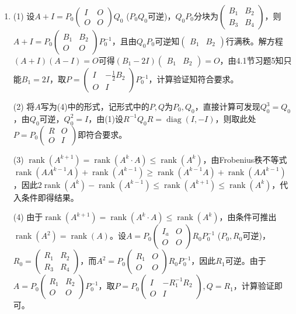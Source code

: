 \documentclass[a4paper,UTF8,fontset=windows]{ctexart}
\DeclareMathOperator{\diag}{diag}
\DeclareMathOperator{\rank}{rank}
\begin{document}
\begin{enumerate}
\item
(1) 设$A+I=P_0\begin{pmatrix}I&O\\O&O\end{pmatrix}Q_0$ ($P_0Q_0$可逆)，$Q_0P_0$分块为$\begin{pmatrix}B_1&B_2\\B_3&B_4\end{pmatrix}$，则$A+I=P_0\begin{pmatrix}B_1&B_2\\O&O\end{pmatrix}P_0^{-1}$，且由$Q_0P_0$可逆知$\begin{pmatrix}B_1&B_2\end{pmatrix}$行满秩。解方程$(A+I)(A-I)=O$可得$(B_1-2I)\begin{pmatrix}B_1&B_2\end{pmatrix}=O$，由4.1节习题5知只能$B_1=2I$，取$P=\begin{pmatrix}I&-\frac{1}{2}B_2\\O&I\end{pmatrix}P_0^{-1}$，计算验证知符合要求。

(2) 将$A$写为(4)中的形式，记形式中的$P,Q$为$P_0,Q_0$，直接计算可发现$Q_0^3=Q_0$，由$Q_0$可逆，$Q_0^2=I$，由(1)设$R^{-1}Q_0R=\diag(I,-I)$，则取此处$P=P_0\begin{pmatrix}R&O\\O&I\end{pmatrix}$即符合要求。

(3) $\rank(A^{k+1})=\rank(A^k\cdot A)\le\rank(A^k)$，由Frobenius秩不等式$\rank(AA^{k-1}A)+\rank(A^{k-1})\ge \rank(A^{k-1}A)+\rank(AA^{k-1})$，因此$2\rank(A^k)-\rank(A^{k-1})\le \rank(A^{k+1})\le\rank(A^k)$，代入条件即得结果。

(4) 由于$\rank(A^{k+1})=\rank(A^k\cdot A)\le\rank(A^k)$，由条件可推出$\rank(A^2)=\rank(A)$。设$A=P_0\begin{pmatrix}I_a&O\\O&O\end{pmatrix}R_0P_0^{-1}$ ($P_0,R_0$可逆)，$R_0=\begin{pmatrix}R_1&R_2\\R_3&R_4\end{pmatrix}$，而$A^2=P_0\begin{pmatrix}R_1&O\\O&O\end{pmatrix}R_0P_0^{-1}$，因此$R_1$可逆。由于$A=P_0\begin{pmatrix}R_1&R_2\\O&O\end{pmatrix}P_0^{-1}$，取$P=P_0\begin{pmatrix}I&-R_1^{-1}R_2\\O&I\end{pmatrix},Q=R_1$，计算验证即可。


\end{enumerate}
\end{document}
